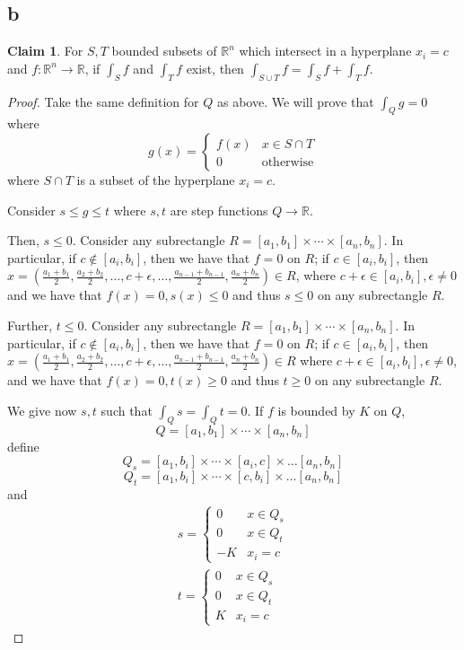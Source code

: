 \documentclass[12pt,letterpaper]{article}
\theoremstyle{definition}
\newtheorem*{claim}{Claim}
\newcommand{\R}{\mathbb{R}}
\begin{document}
\subsection*{b}

\begin{claim}
  For $S, T$ bounded subsets of $\R^n$ which intersect in a hyperplane $x_i = c$ and $f: \R^n \rightarrow \R$, if
  $\int_Sf$ and $\int_T f$ exist, then $\int_{S \cup T}f = \int_Sf + \int_Tf$.
\end{claim}

\begin{proof}
  Take the same definition for $Q$ as above. We will prove that $\int_Qg = 0$
  where
  \[
    g(x) =
    \begin{cases}
      f(x) & x \in S \cap T \\
      0 & \text{otherwise}
    \end{cases}
  \]
  where $S \cap T$ is a subset of the hyperplane $x_i = c$.
  
  Consider $s \leq g \leq t$ where $s, t$ are step functions $Q \rightarrow \R$.

  Then, $s \leq 0$. Consider any subrectangle $R = [a_1, b_1]
  \times \cdots \times [a_n, b_n]$. In particular, if $c \notin [a_i, b_i]$,
  then we have that $f = 0$ on $R$; if $c \in [a_i, b_i]$, then $x =
  (\frac{a_1+b_1}{2}, \frac{a_2+b_2}{2} , \dots, c + \epsilon, \dots,
  \frac{a_{n-1}+b_{n-1}}{2}, \frac{a_n+b_n}{2}) \in R$, where $c + \epsilon \in
  [a_i, b_i], \epsilon \neq 0$ and we have that $f(x) =
  0, s(x) \leq 0$ and thus $s \leq 0$ on any subrectangle $R$.

  Further, $t \leq 0$. Consider any subrectangle $R = [a_1, b_1]
  \times \cdots \times [a_n, b_n]$. In particular, if $c \notin [a_i, b_i]$,
  then we have that $f = 0$ on $R$; if $c \in [a_i, b_i]$, then $x =
  (\frac{a_1+b_1}{2}, \frac{a_2+b_2}{2} , \dots, c + \epsilon, \dots,
  \frac{a_{n-1}+b_{n-1}}{2}, \frac{a_n+b_n}{2}) \in R$ where $c + \epsilon \in
  [a_i, b_i], \epsilon \neq 0$, and we have that $f(x) =
  0, t(x) \geq 0$ and thus $t \geq 0$ on any subrectangle $R$.

  We give now $s, t$ such that $\int_Q s = \int_Qt = 0$. If $f$ is bounded by
  $K$ on $Q$,
  \[
    Q = [a_1, b_1] \times \cdots \times [a_n,b_n]
  \]
  define
  \[
    Q_s = [a_1, b_i] \times \cdots \times [a_i, c] \times \dots [a_n, b_n]
  \]
  \[
    Q_t = [a_1, b_i] \times \cdots \times [c,b_i] \times \dots [a_n, b_n]
  \]
  and
  \begin{gather*}
    s =
    \begin{cases}
      0 & x \in Q_s \\
      0 & x \in Q_t \\
      -K & x_i = c
    \end{cases} \\
    t = 
    \begin{cases}
      0 & x \in Q_s \\
      0 & x \in Q_t \\
      K & x_i = c
    \end{cases}
  \end{gather*}


\end{proof}
\end{document}
